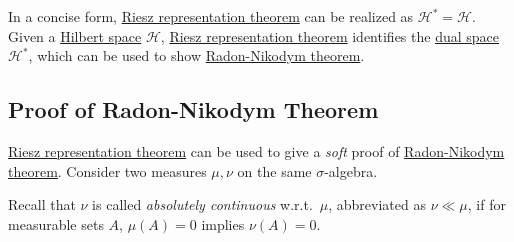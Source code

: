 In a concise form, \hyperref[thm:Riesz-representation]{Riesz representation theorem} can be realized as \(\mathcal{H} ^{\ast} = \mathcal{H} \). Given a \hyperref[def:Hilbert-space]{Hilbert space} \(\mathcal{H} \), \hyperref[thm:Riesz-representation]{Riesz representation theorem} identifies the \hyperref[def:dual-space]{dual space} \(\mathcal{H} ^{\ast} \), which can be used to show \hyperref[thm:Radon-Nikodym]{Radon-Nikodym theorem}.

\subsection{Proof of Radon-Nikodym Theorem}
\hyperref[thm:Riesz-representation]{Riesz representation theorem} can be used to give a \emph{soft} proof of \hyperref[thm:Radon-Nikodym]{Radon-Nikodym theorem}. Consider two measures \(\mu , \nu \) on the same \(\sigma \)-algebra.

\begin{prev}\label{prev:absolutely-continuous}
	Recall that \(\nu \) is called \emph{absolutely continuous} w.r.t.\ \(\mu \), abbreviated as \(\nu \ll \mu \), if for measurable sets \(A\), \(\mu (A)= 0\) implies \(\nu (A) = 0\).
\end{prev}

